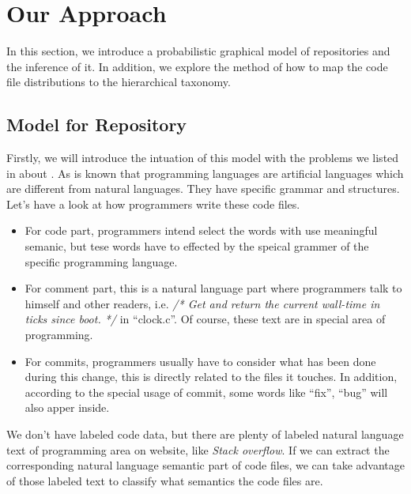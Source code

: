 \section{Our Approach}
In this section, we introduce a probabilistic graphical model of repositories
and the inference of it. In addition, we explore the method of how to map 
the code file distributions to the hierarchical taxonomy.
\subsection{Model for Repository}
\label{sec:method}
Firstly, we will introduce the intuation of this model with the problems
we listed in  about . As is known that
programming languages are artificial languages which are different from
natural languages. They have specific grammar and structures. Let's have a
look at how programmers write these code files. 
\begin{itemize}
\item For code part, programmers intend select the words with use meaningful
semanic, but tese words have to effected by the speical grammer of the specific
programming language.
\item For comment part, this is a natural language part where programmers
talk to himself and other readers, i.e. {\it /* Get and return 
the current wall-time in ticks since boot. */} in ``clock.c''. Of course,
these text are in special area of programming.
\item For commits, programmers usually have to consider what has been done
during this change, this is directly related to the files it touches. In addition,
according to the special usage of commit, some words like ``fix'', ``bug'' will 
also apper inside.
\end{itemize}

We don't have labeled code data, but there are plenty of labeled natural language text
of programming area on website, like {\it Stack overflow}. If we can extract
the corresponding natural language semantic part of code files, we can take
advantage of those labeled text to classify what semantics the code files are.


